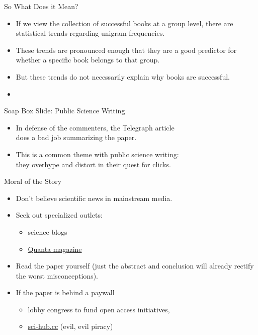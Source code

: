 \documentclass[professionalfonts, xcolor={usenames,svgnames,x11names,table}]{beamer}
\begin{document}
\begin{frame}{So What Does it Mean?}
    \begin{itemize}
        \item If we view the collection of successful books at a group level, there are statistical trends regarding unigram frequencies.
        \item These trends are pronounced enough that they are a good predictor for whether a specific book belongs to that group.
        \item But these trends do not necessarily explain why books are successful.
        \item {}
    \end{itemize}
\end{frame}

\begin{frame}{Soap Box Slide: Public Science Writing}
    \begin{itemize}
        \item In defense of the commenters, the Telegraph article\\
            does a bad job summarizing the paper.
        \item This is a common theme with public science writing:\\
            they overhype and distort in their quest for clicks.
    \end{itemize}

    \begin{block}{Moral of the Story}
        \begin{itemize}
            \item Don't believe scientific news in mainstream media.
            \item Seek out specialized outlets:
                \begin{itemize}
                    \item science blogs
                    \item \href{https://www.quantamagazine.org/}{Quanta magazine}
                \end{itemize}
            \item Read the paper yourself (just the abstract and conclusion will already rectify the worst misconceptions).
            \item If the paper is behind a paywall
                \begin{itemize}
                    \item lobby congress to fund open access initiatives,
                    \item \url{sci-hub.cc} (evil, evil piracy)
                \end{itemize}
        \end{itemize}
    \end{block}
\end{frame}
\end{document}
